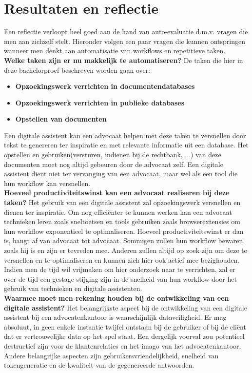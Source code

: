 \chapter{Resultaten en reflectie}
Een reflectie verloopt heel goed aan de hand van auto-evaluatie d.m.v. vragen die men aan zichzelf stelt. 
Hieronder volgen een paar vragen die kunnen ontspringen wanneer men denkt aan automatisatie van workflows en repetitieve taken.\\ 

\textbf{Welke taken zijn er nu makkelijk te automatiseren?}
De taken die hier in deze bachelorproef beschreven worden gaan over:
\begin{itemize}
	\item \textbf{Opzoekingswerk verrichten in documentendatabases}
	\item \textbf{Opzoekingswerk verrichten in publieke databases}
	\item \textbf{Opstellen van documenten}
\end{itemize}
Een digitale assistent kan een advocaat helpen met deze taken te versnellen door tekst te genereren ter inspiratie en met relevante informatie uit een database. 
Het opstellen en gebruiken(versturen, indienen bij de rechtbank, ...) van deze documenten moet nog altijd gebeuren door de advocaat zelf. 
Een digitale assistent dient niet ter vervanging van een advocaat, maar wel als een tool die hun workflow kan versnellen. \\ 

\textbf{Hoeveel productiviteitswinst kan een advocaat realiseren bij deze taken?}
Het gebruik van een digitale assistent zal opzoekingswerk versnellen en dienen ter inspiratie. 
Om nog efficiënter te kunnen werken kan een advocaat technieken leren zoals sneltoetsen en tools gebruiken zoals browserextensies om hun workflow exponentieel te optimaliseren. 
Hoeveel productiviteitswinst er dan is, hangt af van advocaat tot advocaat. 
Sommigen zullen hun workflow bewaren zoals hij is en zijn er tevreden mee. 
Anderen zullen altijd op zoek zijn om deze te versnellen en te optimaliseren en kunnen zich hier ook actief mee bezighouden. 
Indien men de tijd wil vrijmaken om hier onderzoek naar te verrichten, zal er over de tijd een gestage stijging 
zijn in de snelheid van hun workflow door het gebruik van technieken en digitale assistenten. \\ 

\textbf{Waarmee moet men rekening houden bij de ontwikkeling van een digitale assistent?}
Het belangrijkste aspect bij de ontwikkeling van een digitale assistent bij een advocatenkantoor is waarschijnlijk dataveiligheid. 
Er mag absoluut, in geen enkele instantie twijfel ontstaan bij de gebruiker of bij de cliënt dat er vertrouwelijke data op het spel staat.  
Een dergelijk voorval zou potentieel destructief zijn voor de klantenrelaties en het imago van het advocatenkantoor. 
Andere belangrijke aspecten zijn gebruikersvriendelijkheid, snelheid van tokengeneratie en de kwaliteit van de gegenereerde antwoorden.\\ 

